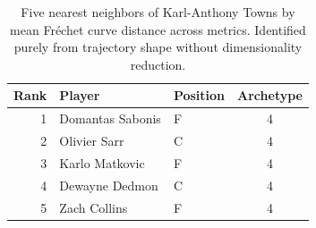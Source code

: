 \begin{table}[htbp]
  \centering\small
  \begin{tabular}{rllc}
    \toprule
    Rank & Player & Position & Archetype \\
    \midrule
    1 & Domantas Sabonis & F & 4 \\
    2 & Olivier Sarr & C & 4 \\
    3 & Karlo Matkovic & F & 4 \\
    4 & Dewayne Dedmon & C & 4 \\
    5 & Zach Collins & F & 4 \\
    \bottomrule
  \end{tabular}
  \caption{Five nearest neighbors of Karl-Anthony Towns by mean Fr\'{e}chet curve distance across metrics. Identified purely from trajectory shape without dimensionality reduction.}
  \label{tab:Karl_Anthony_Towns_frechet_curve_neighbors}
\end{table}

